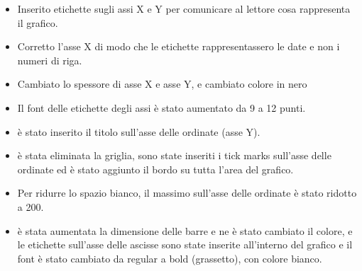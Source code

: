 \documentclass[9pt,a4paper,twoside]{rho-class/rho}
\begin{document}
\begin{itemize}
    \item Inserito etichette sugli assi X e Y per comunicare al lettore cosa rappresenta il grafico.
    \item Corretto l'asse X di modo che le etichette rappresentassero le date e non i numeri di riga.
    \item Cambiato lo spessore di asse X e asse Y, e cambiato colore in nero
    \item Il font delle etichette degli assi è stato aumentato da 9 a 12 punti. 
    \item è stato inserito il titolo sull'asse delle ordinate (asse Y).
    \item è stata eliminata la griglia, sono state inseriti i tick marks sull'asse delle ordinate ed è stato aggiunto il bordo su tutta l'area del grafico.
    \item Per ridurre lo spazio bianco, il massimo sull'asse delle ordinate è stato ridotto a 200.
    \item è stata aumentata la dimensione delle barre e ne è stato cambiato il colore, e le etichette sull'asse delle ascisse sono state inserite all'interno del grafico e il font è stato cambiato da regular a bold (grassetto), con colore bianco.
\end{itemize}
\end{document}
